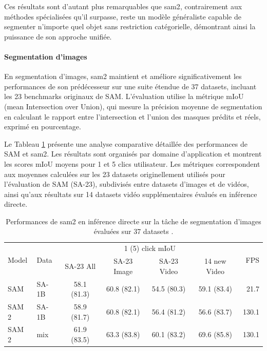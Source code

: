 Ces résultats sont d'autant plus remarquables que \acrshort{sam2}, contrairement aux méthodes spécialisées qu'il surpasse, reste un modèle généraliste capable de segmenter n'importe quel objet sans restriction catégorielle, démontrant ainsi la puissance de son approche unifiée.

\paragraph{Segmentation d'images}

En segmentation d'images, \acrshort{sam2} maintient et améliore significativement les performances de son prédécesseur sur une suite étendue de 37 datasets, incluant les 23 benchmarks originaux de SAM. L'évaluation utilise la métrique mIoU (mean Intersection over Union), qui mesure la précision moyenne de segmentation en calculant le rapport entre l'intersection et l'union des masques prédits et réels, exprimé en pourcentage.

Le Tableau \ref{tab:ch2_sam2_resultats_segmentation_image_miou} présente une analyse comparative détaillée des performances de SAM et \acrshort{sam2}. Les résultats sont organisés par domaine d'application et montrent les scores mIoU moyens pour 1 et 5 clics utilisateur. Les métriques correspondent aux moyennes calculées sur les 23 datasets originellement utilisés pour l'évaluation de SAM (SA-23), subdivisés entre datasets d'images et de vidéos, ainsi qu'aux résultats sur 14 datasets vidéo supplémentaires évalués en inférence directe.

\begin{table}[H]
    \centering
    \begin{tabular}{llccccr}
        \multirow{2}{*}{Model} & \multirow{2}{*}{Data} & \multicolumn{4}{c}{1 (5) click mIoU} & \multirow{2}{*}{FPS} \\
        \cline{3-6}
        & & SA-23 All & SA-23 Image & SA-23 Video & 14 new Video & \\
        \hline
        SAM & SA-1B & 58.1 (81.3) & 60.8 (82.1) & 54.5 (80.3) & 59.1 (83.4) & 21.7 \\
        SAM 2 & SA-1B & 58.9 (81.7) & 60.8 (82.1) & 56.4 (81.2) & 56.6 (83.7) & 130.1 \\
        SAM 2 & mix & 61.9 (83.5) & 63.3 (83.8) & 60.1 (83.2) & 69.6 (85.8) & 130.1 \\
        \hline
    \end{tabular}
    \caption{Performances de \acrshort{sam2} en inférence directe sur la tâche de segmentation d'images évaluées sur 37 datasets \cite{ravi_sam_2024}.}
    \label{tab:ch2_sam2_resultats_segmentation_image_miou}
\end{table}

